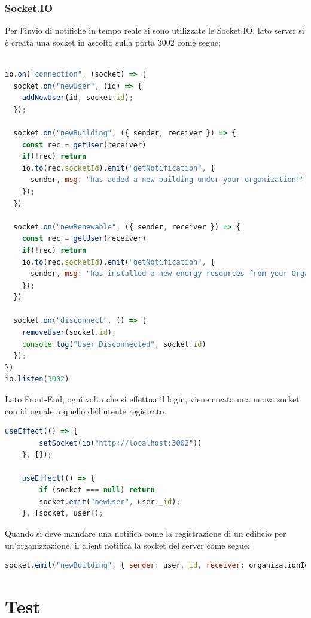 \documentclass{report}
\begin{document}
\subsection {Socket.IO}
Per l'invio di notifiche in tempo reale si sono utilizzate le Socket.IO, lato server si è creata una socket in ascolto sulla porta 3002  come segue: 
\begin{lstlisting}[language=JavaScript]

io.on("connection", (socket) => {
  socket.on("newUser", (id) => {
    addNewUser(id, socket.id);
  });

  socket.on("newBuilding", ({ sender, receiver }) => {
    const rec = getUser(receiver)
    if(!rec) return
    io.to(rec.socketId).emit("getNotification", {
      sender, msg: "has added a new building under your organization!", type: "New"
    });
  })

  socket.on("newRenewable", ({ sender, receiver }) => {
    const rec = getUser(receiver)
    if(!rec) return
    io.to(rec.socketId).emit("getNotification", {
      sender, msg: "has installed a new energy resources from your Organization!", type: "Renewable"
    });
  })

  socket.on("disconnect", () => {
    removeUser(socket.id);
    console.log("User Disconnected", socket.id)
  });
})
io.listen(3002)
\end{lstlisting}
Lato Front-End, ogni volta che si effettua il login, viene creata una nuova socket con id uguale a quello dell'utente registrato.
\begin{lstlisting}[language=JavaScript]
 useEffect(() => {
        setSocket(io("http://localhost:3002"))
    }, []);

    useEffect(() => {
        if (socket === null) return
        socket.emit("newUser", user._id);
    }, [socket, user]);
\end{lstlisting}

Quando si deve mandare una notifica come la registrazione di un edificio per un'organizzazione, il client notifica la socket del server come segue:
\begin{lstlisting}[language=JavaScript]
socket.emit("newBuilding", { sender: user._id, receiver: organizationId })
\end{lstlisting}
\chapter{Test}
\end{document}
